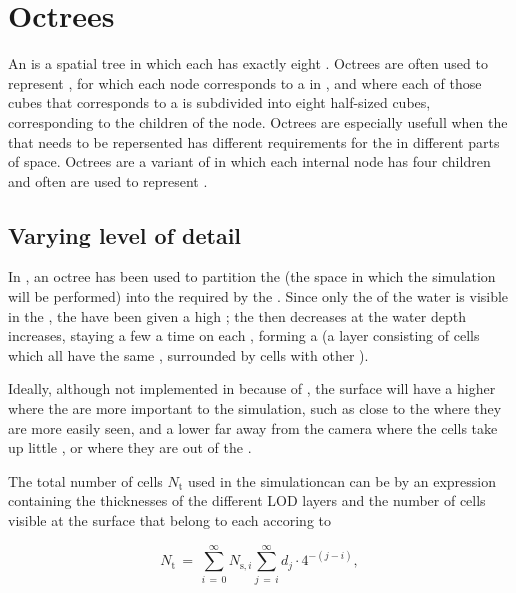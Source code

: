 \chapter{Octrees}

An \octree is a spatial tree  in which each  has exactly eight . Octrees are often used to represent , for which each node corresponds to a \cube in , and where each of those cubes that corresponds to a  is subdivided into eight half-sized cubes, corresponding to the children of the node. Octrees are especially usefull when the \data that needs to be repersented has different requirements for the \LOD in different parts of space. Octrees are a variant of \quadtrees in which each internal node has four children and often are used to represent .

\section{Varying level of detail}

In \thiswork, an octree has been used to partition the  (the space in which the simulation will be performed) into the \cells required by the \FVM. Since only the \surface of the water is visible in the \simulation, the  have been given a high \LOD; the \LOD then decreases at the water depth increases, staying a few  a time on each \LOD, forming a  (a layer consisting of cells which all have the same \LOD, surrounded by cells with other \LODs).

Ideally, although not implemented in \thiswork because of \itslimitedtime, the surface will have a higher \LOD where the  are more important to the simulation, such as close to the \camera where they are more easily seen, and a lower \LOD far away from the camera where the cells take up little , or where they are out of the \FOV.

The total number of cells $N_{\text{t}}$ used in the simulationcan can be \approximated by an expression containing the thicknesses of the different LOD layers and the number of cells visible at the surface that belong to each \LOD accoring to

\begin{equation} \label{eq:number_of_cells_total_sum}
N_{\text{t}} \,=\, \sum_{i\,=\,0}^\infty N_{\text{s},i}\sum_{j\,=\,i}^\infty d_j\cdot 4^{-(j-i)},
\end{equation}

